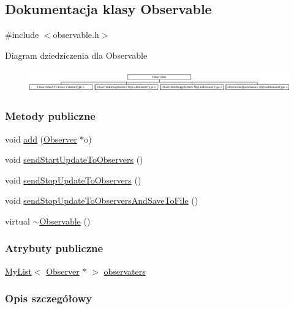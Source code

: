 \hypertarget{class_observable}{\subsection{Dokumentacja klasy Observable}
\label{class_observable}
}


{\ttfamily \#include $<$observable.\-h$>$}

Diagram dziedziczenia dla Observable\begin{figure}[H]
\begin{center}
\leavevmode
\includegraphics[height=0.962199cm]{class_observable}
\end{center}
\end{figure}
\subsubsection*{Metody publiczne}
\begin{DoxyCompactItemize}
\item 
void \hyperlink{class_observable_acfdb25294a3125e351ba9dc2f08fdda2}{add} (\hyperlink{class_observer}{Observer} $\ast$o)
\item 
void \hyperlink{class_observable_a78df64057f152342a43f27979186a6ba}{send\-Start\-Update\-To\-Observers} ()
\item 
void \hyperlink{class_observable_a16f75ed1514a0cb7526b5a5d2b7ca7c6}{send\-Stop\-Update\-To\-Observers} ()
\item 
void \hyperlink{class_observable_a2deff078096cccc4f2fb3293d1a3e8ff}{send\-Stop\-Update\-To\-Observers\-And\-Save\-To\-File} ()
\item 
virtual \hyperlink{class_observable_a42f551d4d64ffa48a2ea8d7f0a4e42d4}{$\sim$\-Observable} ()
\end{DoxyCompactItemize}
\subsubsection*{Atrybuty publiczne}
\begin{DoxyCompactItemize}
\item 
\hyperlink{class_my_list}{My\-List}$<$ \hyperlink{class_observer}{Observer} $\ast$ $>$ \hyperlink{class_observable_a23f06cfbce27372d95fb556ca1f392ee}{observaters}
\end{DoxyCompactItemize}


\subsubsection{Opis szczegółowy}


